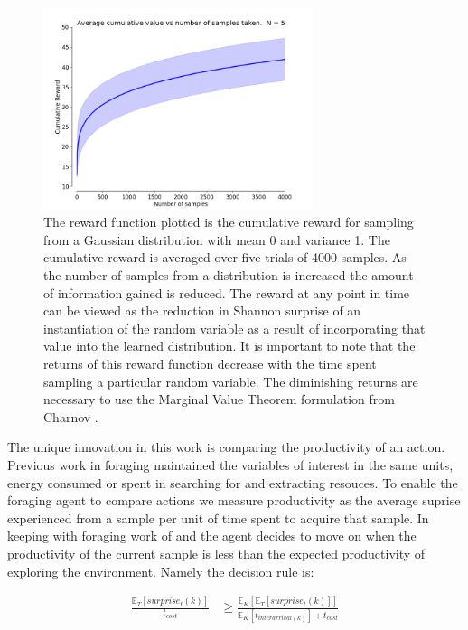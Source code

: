 
\begin{figure}[htpd!]
	\centering
	\includegraphics[width=0.7\textwidth]{images/cumulative-reward.png}
	\caption{The reward function plotted is the cumulative reward for sampling from a Gaussian distribution with mean 0 and variance 1.  The cumulative reward is averaged over five trials of 4000 samples.  As the number of samples from a distribution is increased the amount of information gained is reduced.  The reward at any point in time can be viewed as the reduction in Shannon surprise of an instantiation of the random variable as a result of incorporating that value into the learned distribution.  It is important to note that the returns of this reward function decrease with the time spent sampling a particular random variable.  The diminishing returns are necessary to use the Marginal Value Theorem formulation from Charnov \cite{charnov1973optimal}.}
	\label{fig:reward}
\end{figure}

The unique innovation in this work is comparing the productivity of an action.  Previous work in foraging maintained the variables of interest in the same units, energy consumed or spent in searching for and extracting resouces.  To enable the foraging agent to compare actions we measure productivity as the average suprise experienced from a sample per unit of time spent to acquire that sample.  In keeping with foraging work of \cite{charnov1973optimal} and \cite{pirolli1999information} the agent decides to move on when the productivity of the current sample is less than the expected productivity of exploring the environment.  Namely the decision rule is:

\begin{align*}
	\frac{\mathbb{E}_{T}\left[surprise_{t}\left(k\right)\right]}{t_{cost}} &\geq \frac{\mathbb{E}_{K}\left[\mathbb{E}_{T}\left[surprise_{t}\left(k\right)\right]\right]}{\mathbb{E}_{K}\left[t_{interarrival(k)}\right] + t_{cost}}\\
\end{align*}

